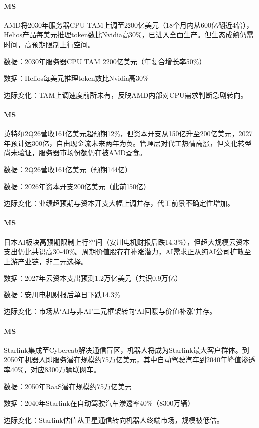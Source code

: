 \documentclass[11pt]{ctexart}
\begin{document}
\paragraph{MS} AMD将2030年服务器CPU TAM上调至2200亿美元（18个月内从600亿翻近4倍），Helios产品每美元推理token数比Nvidia高30\%，已进入全面生产。但生态成熟仍需时间，高预期限制上行空间。
{\small\color{refgray}数据：2030年服务器CPU TAM 2200亿美元（年复合增长率50\%）\par}
{\small\color{refgray}数据：Helios每美元推理token数比Nvidia高30\%\par}
{\small\color{refgray}边际变化：TAM上调速度前所未有，反映AMD内部对CPU需求判断急剧转向。\par}
\paragraph{MS} 英特尔2Q26营收161亿美元超预期12\%，但资本开支从150亿升至200亿美元，2027年预计达300亿，自由现金流未来两年为负。管理层对代工热情高涨，但文化转型尚未验证，服务器市场份额仍在被AMD蚕食。
{\small\color{refgray}数据：2Q26营收161亿美元（预期144亿）\par}
{\small\color{refgray}数据：2026年资本开支200亿美元（此前150亿）\par}
{\small\color{refgray}边际变化：业绩超预期与资本开支大幅上调并存，代工前景不确定性增加。\par}
\paragraph{MS} 日本AI板块高预期限制上行空间（安川电机财报后跌14.3\%），但超大规模云资本支出仍比共识高30-40\%。周期价值股存在补涨潜力，AI需求正从纯AI公司扩散至上游产业链，非二元选择。
{\small\color{refgray}数据：2027年云资本支出预测1.2万亿美元（共识0.9万亿）\par}
{\small\color{refgray}数据：安川电机财报后单日下跌14.3\%\par}
{\small\color{refgray}边际变化：市场从‘AI与非AI’二元框架转向‘AI回暖与价值补涨’并存。\par}
\paragraph{MS} Starlink集成至Cybercab解决通信盲区，机器人将成为Starlink最大客户群体。到2050年机器人即服务潜在规模约75万亿美元，其中自动驾驶汽车到2040年峰值渗透率40\%，对应8300万辆联网车。
{\small\color{refgray}数据：2050年RaaS潜在规模约75万亿美元\par}
{\small\color{refgray}数据：2040年Starlink在自动驾驶汽车渗透率40\%（8300万辆）\par}
{\small\color{refgray}边际变化：Starlink估值从卫星通信转向机器人终端市场，规模被低估。\par}
\end{document}
